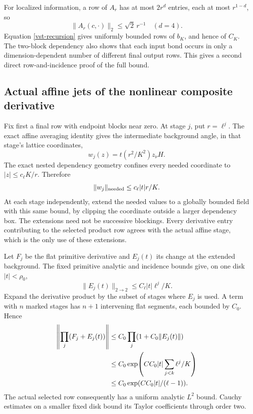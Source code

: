 For localized information, a row of \(A_r\) has at most
\(2r^d\) entries, each at most \(r^{1-d}\), so
\[
              \|A_r(c,\cdot)\|_2\le\sqrt2\,r^{-1}
                         \quad(d=4).
 \]
Equation \eqref{vst-recursion} gives uniformly bounded
rows of \(b_K\), and hence of \(C_K\).
The two-block dependency also shows that each input
bond occurs in only a dimension-dependent number of
different final output rows. This gives a second direct
row-and-incidence proof of the full bound.

\subsection{Actual affine jets of the nonlinear composite derivative}
\label{vst-magnetic-section}

Fix first a final row with endpoint blocks near zero.
At stage \(j\), put \(r=\ell^j\). The exact affine
averaging identity gives the intermediate background
angle, in that stage's lattice coordinates,
\[
                     w_j(z)=t(r^2/K^2)z_\nu H.
\]
The exact nested dependency geometry confines every
needed coordinate to \(|z|\le c_\ell K/r\). Therefore
\begin{equation}
                  \|w_j\|_{\rm needed}
                            \le c_\ell |t|r/K.
 \label{vst-stage-smallness}
\end{equation}
At each stage independently, extend the needed values
to a globally bounded field with this same bound, by
clipping the coordinate outside a larger dependency box.
The extensions need not be successive blockings.
Every derivative entry contributing to the selected
product row agrees with the actual affine stage, which
is the only use of these extensions.

Let \(F_j\) be the flat primitive derivative and
\(E_j(t)\) its change at the extended background.
The fixed primitive analytic and incidence bounds
give, on one disk \(|t|<\rho_0\),
\begin{equation}
                  \|E_j(t)\|_{2\to2}
                          \le C_\ell |t|\ell^j/K.
 \label{vst-stage-error}
\end{equation}
Expand the derivative product by the subset of stages
where \(E_j\) is used. A term with \(n\) marked stages
has \(n+1\) intervening flat segments, each bounded by
\(C_0\). Hence
\begin{align}
 \left\|\prod_j(F_j+E_j(t))\right\|
 &\le C_0\prod_j(1+C_0\|E_j(t)\|)\notag\\
 &\le C_0\exp\!\left(C C_0|t|
                         \sum_{j<k}\ell^j/K\right)\notag\\
 &\le C_0\exp(C C_0|t|/(\ell-1)).
 \label{vst-product-bound}
\end{align}
The actual selected row consequently has a uniform
analytic \(L^2\) bound. Cauchy estimates on a smaller
fixed disk bound its Taylor coefficients through order two.

